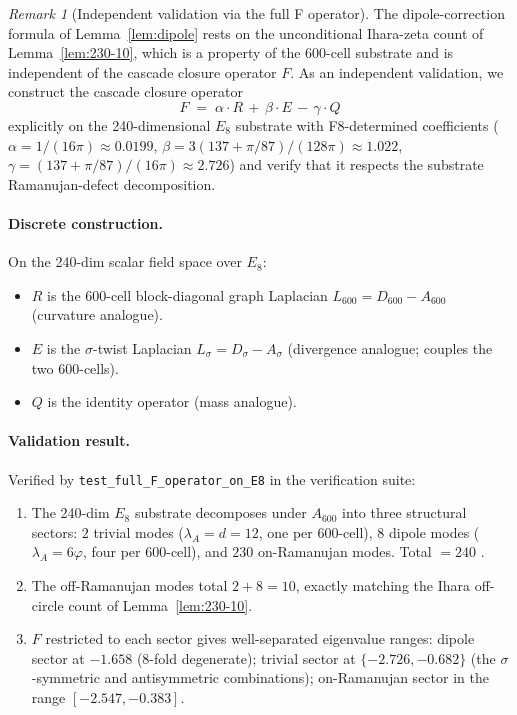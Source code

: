 \documentclass[11pt]{article}
\theoremstyle{plain}
\theoremstyle{definition}
\theoremstyle{remark}
\newtheorem{remark}[theorem]{Remark}
\begin{document}
\begin{remark}[Independent validation via the full F operator]\label{rem:F-validation}
The dipole-correction formula of Lemma~\ref{lem:dipole} rests on the unconditional Ihara-zeta count of Lemma~\ref{lem:230-10}, which is a property of the 600-cell substrate and is independent of the cascade closure operator $F$. As an independent validation, we construct the cascade closure operator
\[
  F \;=\; \alpha \cdot R \,+\, \beta \cdot E \,-\, \gamma \cdot Q
\]
explicitly on the 240-dimensional $E_8$ substrate with F8-determined coefficients ($\alpha = 1/(16\pi) \approx 0.0199$, $\beta = 3(137 + \pi/87)/(128\pi) \approx 1.022$, $\gamma = (137 + \pi/87)/(16\pi) \approx 2.726$) and verify that it respects the substrate Ramanujan-defect decomposition.

\paragraph{Discrete construction.} On the 240-dim scalar field space over $E_8$:
\begin{itemize}[leftmargin=2em]
\item $R$ is the 600-cell block-diagonal graph Laplacian $L_{600} = D_{600} - A_{600}$ (curvature analogue).
\item $E$ is the $\sigma$-twist Laplacian $L_\sigma = D_\sigma - A_\sigma$ (divergence analogue; couples the two 600-cells).
\item $Q$ is the identity operator (mass analogue).
\end{itemize}

\paragraph{Validation result.} Verified by \texttt{test\_full\_F\_operator\_on\_E8} in the verification suite:
\begin{enumerate}[leftmargin=2em]
\item The 240-dim $E_8$ substrate decomposes under $A_{600}$ into three structural sectors: $2$ trivial modes ($\lambda_A = d = 12$, one per 600-cell), $8$ dipole modes ($\lambda_A = 6\varphi$, four per 600-cell), and $230$ on-Ramanujan modes. Total $= 240$ \checkmark.
\item The off-Ramanujan modes total $2 + 8 = 10$, exactly matching the Ihara off-circle count of Lemma~\ref{lem:230-10}.
\item $F$ restricted to each sector gives well-separated eigenvalue ranges: dipole sector at $-1.658$ (8-fold degenerate); trivial sector at $\{-2.726, -0.682\}$ (the $\sigma$-symmetric and antisymmetric combinations); on-Ramanujan sector in the range $[-2.547, -0.383]$.
\end{enumerate}


\end{remark}
\end{document}

